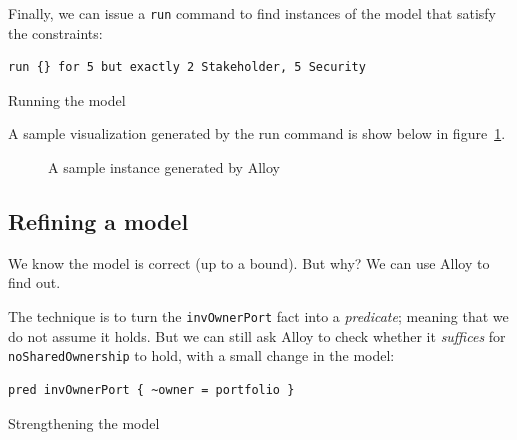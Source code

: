 \newpage

Finally, we can issue a \verb|run| command to find instances of the model that satisfy the constraints:

\begin{listing}[H]\label{lst:alloy-run}
	\begin{verbatim}
run {} for 5 but exactly 2 Stakeholder, 5 Security
\end{verbatim}
	\caption{Running the model}
\end{listing}

A sample visualization generated by the run command is show below in figure~\ref{fig:alloy-run}.

\begin{figure}[H]
	\centering
	\caption{A sample instance generated by Alloy}\label{fig:alloy-run}
\end{figure}

\subsection{Refining a model}

We know the model is correct (up to a bound). But why? We can use Alloy to find out.

\newpage

The technique is to turn the \verb|invOwnerPort| fact into a \textit{predicate}; meaning that we do not assume it holds. But we can still ask Alloy to check whether it \textit{suffices} for \verb|noSharedOwnership| to hold, with a small change in the model:

\begin{listing}[H]\label{lst:alloy-strengthen}
	\begin{verbatim}
pred invOwnerPort { ~owner = portfolio }
\end{verbatim}
	\caption{Strengthening the model}
\end{listing}

